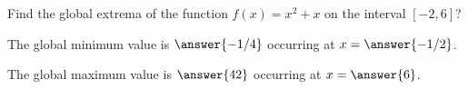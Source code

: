 \documentclass{ximera}
\begin{document}
\begin{exercise}

Find the global extrema of the function $f(x) = x^2 +x$ on the interval
$[-2,6]$?

The global minimum value is $\answer{-1/4}$ occurring at $x = \answer{-1/2}$.

The global maximum value is $\answer{42}$ occurring at $x = \answer{6}$.

\end{exercise}
\end{document}
